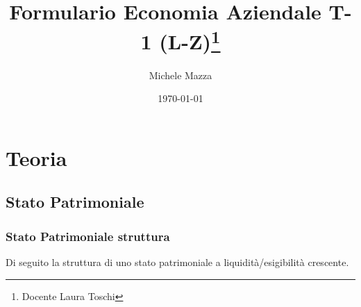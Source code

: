 \documentclass{book}
\title{Formulario Economia Aziendale T-1 (L-Z)\thanks{Docente Laura Toschi}}
\author{Michele Mazza}
\date{\today}
\begin{document}
\frontmatter
\maketitle
\tableofcontents

\chapter{Teoria}
\section{Stato Patrimoniale}
\subsection{Stato Patrimoniale struttura}
Di seguito la struttura di uno stato patrimoniale a liquidità/esigibilità crescente.
\setlength{\extrarowheight}{5pt} %
\end{document}
